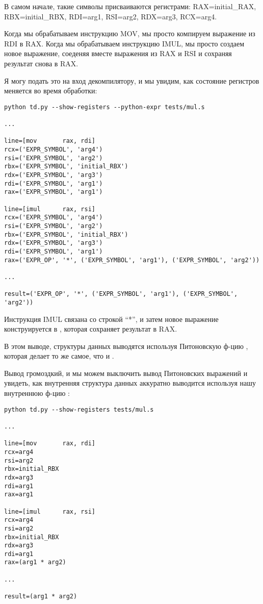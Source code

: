 В самом начале, такие символы присваиваются регистрами:
RAX=initial\_RAX,
RBX=initial\_RBX,
RDI=arg1,
RSI=arg2,
RDX=arg3,
RCX=arg4.

Когда мы обрабатываем инструкцию MOV, мы просто компируем выражение из RDI в RAX.
Когда мы обрабатываем инструкцию IMUL, мы просто создаем новое выражение, соеденяя вместе выражения из RAX и RSI
и сохраняя результат снова в RAX.

Я могу подать это на вход декомпилятору, и мы увидим, как состояние регистров меняется во время обработки:

\begin{lstlisting}
python td.py --show-registers --python-expr tests/mul.s

...

line=[mov       rax, rdi]
rcx=('EXPR_SYMBOL', 'arg4')
rsi=('EXPR_SYMBOL', 'arg2')
rbx=('EXPR_SYMBOL', 'initial_RBX')
rdx=('EXPR_SYMBOL', 'arg3')
rdi=('EXPR_SYMBOL', 'arg1')
rax=('EXPR_SYMBOL', 'arg1')

line=[imul      rax, rsi]
rcx=('EXPR_SYMBOL', 'arg4')
rsi=('EXPR_SYMBOL', 'arg2')
rbx=('EXPR_SYMBOL', 'initial_RBX')
rdx=('EXPR_SYMBOL', 'arg3')
rdi=('EXPR_SYMBOL', 'arg1')
rax=('EXPR_OP', '*', ('EXPR_SYMBOL', 'arg1'), ('EXPR_SYMBOL', 'arg2'))

...

result=('EXPR_OP', '*', ('EXPR_SYMBOL', 'arg1'), ('EXPR_SYMBOL', 'arg2'))
\end{lstlisting}

Инструкция IMUL связана со строкой ``*'', и затем новое выражение конструируется в
, которая сохраняет результат в RAX.

В этом выводе, структуры данных выводятся используя Питоновскую ф-цию ,
которая делает то же самое, что и .

Вывод громоздкий, и мы можем выключить вывод Питоновских выражений и увидеть, как внутренняя структура данных аккуратно
выводится используя нашу внутреннюю ф-цию :

\begin{lstlisting}
python td.py --show-registers tests/mul.s

...

line=[mov       rax, rdi]
rcx=arg4
rsi=arg2
rbx=initial_RBX
rdx=arg3
rdi=arg1
rax=arg1

line=[imul      rax, rsi]
rcx=arg4
rsi=arg2
rbx=initial_RBX
rdx=arg3
rdi=arg1
rax=(arg1 * arg2)

...

result=(arg1 * arg2)
\end{lstlisting}

